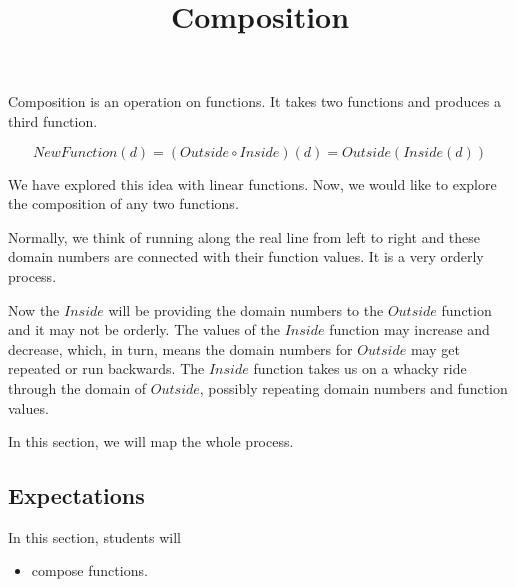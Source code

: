 \documentclass{ximera}
\title{Composition}
\begin{document}
\begin{abstract}
\end{abstract}
\maketitle













Composition is an operation on functions.  It takes two functions and produces a third function.


\[  NewFunction(d) = (Outside \circ Inside)(d) = Outside(Inside(d))    \]



We have explored this idea with linear functions.  Now, we would like to explore the composition of any two functions.






Normally, we think of running along the real line from left to right and these domain numbers are connected with their function values.  It is a very orderly process.

Now the $Inside$ will be providing the domain numbers to the $Outside$ function and it may not be orderly. The values of the $Inside$ function may increase and decrease, which, in turn, means the domain numbers for $Outside$ may get repeated or run backwards.   The $Inside$ function takes us on a whacky ride through the domain of $Outside$, possibly repeating domain numbers and function values.


In this section, we will map the whole process.










\subsection{Expectations}





\begin{sectionOutcomes}
In this section, students will 

\begin{itemize}
\item compose functions.
\end{itemize}
\end{sectionOutcomes}
\end{document}
